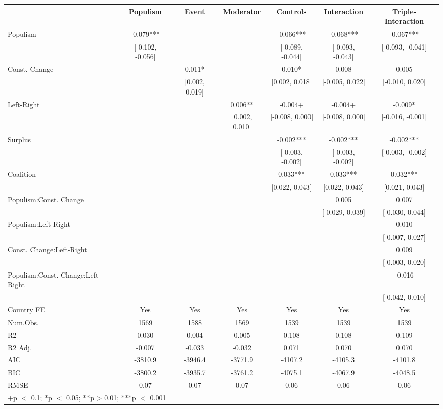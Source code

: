 \begin{table}
\centering\centering\centering
\begin{tabular}[t]{lcccccc}
\toprule
  & Populism & Event & Moderator & Controls & Interaction & Triple-Interaction\\
\midrule
Populism & -0.079*** &  &  & -0.066*** & -0.068*** & -0.067***\\
 & {}[-0.102, -0.056] &  &  & {}[-0.089, -0.044] & {}[-0.093, -0.043] & {}[-0.093, -0.041]\\
Const. Change &  & 0.011* &  & 0.010* & 0.008 & 0.005\\
 &  & {}[0.002, 0.019] &  & {}[0.002, 0.018] & {}[-0.005, 0.022] & {}[-0.010, 0.020]\\
Left-Right &  &  & 0.006** & -0.004+ & -0.004+ & -0.009*\\
 &  &  & {}[0.002, 0.010] & {}[-0.008, 0.000] & {}[-0.008, 0.000] & {}[-0.016, -0.001]\\
Surplus &  &  &  & -0.002*** & -0.002*** & -0.002***\\
 &  &  &  & {}[-0.003, -0.002] & {}[-0.003, -0.002] & {}[-0.003, -0.002]\\
Coalition &  &  &  & 0.033*** & 0.033*** & 0.032***\\
 &  &  &  & {}[0.022, 0.043] & {}[0.022, 0.043] & {}[0.021, 0.043]\\
Populism:Const. Change &  &  &  &  & 0.005 & 0.007\\
 &  &  &  &  & {}[-0.029, 0.039] & {}[-0.030, 0.044]\\
Populism:Left-Right &  &  &  &  &  & 0.010\\
 &  &  &  &  &  & {}[-0.007, 0.027]\\
Const. Change:Left-Right &  &  &  &  &  & 0.009\\
 &  &  &  &  &  & {}[-0.003, 0.020]\\
Populism:Const. Change:Left-Right &  &  &  &  &  & -0.016\\
 &  &  &  &  &  & {}[-0.042, 0.010]\\
\midrule
Country FE & Yes & Yes & Yes & Yes & Yes & Yes\\
Num.Obs. & 1569 & 1588 & 1569 & 1539 & 1539 & 1539\\
R2 & 0.030 & 0.004 & 0.005 & 0.108 & 0.108 & 0.109\\
R2 Adj. & -0.007 & -0.033 & -0.032 & 0.071 & 0.070 & 0.070\\
AIC & -3810.9 & -3946.4 & -3771.9 & -4107.2 & -4105.3 & -4101.8\\
BIC & -3800.2 & -3935.7 & -3761.2 & -4075.1 & -4067.9 & -4048.5\\
RMSE & 0.07 & 0.07 & 0.07 & 0.06 & 0.06 & 0.06\\
\bottomrule
\multicolumn{7}{l}{\rule{0pt}{1em}+p $<$ 0.1; *p $<$ 0.05; **p > 0.01; ***p $<$ 0.001}\\
\end{tabular}
\end{table}
